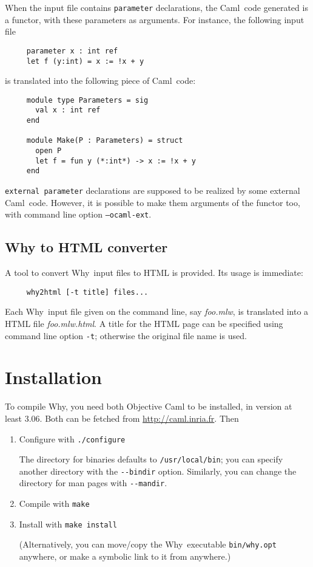 \documentclass[a4paper,12pt]{report}
\newcommand{\caml}{\textsf{Caml}}
\newcommand{\why}{\textsf{Why}}
\begin{document}
When the input file contains \texttt{parameter} declarations, the
\caml\ code generated is a functor, with these parameters as
arguments. For instance, the following input file
\begin{verbatim}
     parameter x : int ref
     let f (y:int) = x := !x + y
\end{verbatim}
is translated into the following piece of \caml\ code:
\begin{verbatim}
     module type Parameters = sig
       val x : int ref
     end

     module Make(P : Parameters) = struct
       open P
       let f = fun y (*:int*) -> x := !x + y
     end
\end{verbatim}
\texttt{external parameter} declarations are supposed to be realized by some
external \caml\ code. However, it is possible to make them arguments
of the functor too, with command line option \texttt{--ocaml-ext}.

\subsection{Why to HTML converter}
A tool to convert \why\ input files to HTML is provided. Its usage is
immediate:
\begin{verbatim}
     why2html [-t title] files...
\end{verbatim}
Each \why\ input file given on the command line, say \textit{foo.mlw},
is translated into a HTML file \textit{foo.mlw.html}. A title for the
HTML page can be specified using command line option \texttt{-t};
otherwise the original file name is used.


\section{Installation}
\label{install}

To compile \why, you need both \textsf{Objective Caml} to be
installed, in version at least 3.06. Both can 
be fetched from \url{http://caml.inria.fr}.
Then 

\begin{enumerate}
\item Configure with \texttt{./configure}

  The directory for binaries defaults to \texttt{/usr/local/bin}; you
  can specify another directory with the \texttt{-{}-bindir}
  option. Similarly, you can change the directory for man pages with
  \texttt{-{}-mandir}.

\item Compile with \texttt{make}

\item Install with \texttt{make install}

  (Alternatively, you can move/copy the \why\ executable
  \texttt{bin/why.opt} anywhere, or make a symbolic link to it from anywhere.)
\end{enumerate}
\end{document}

